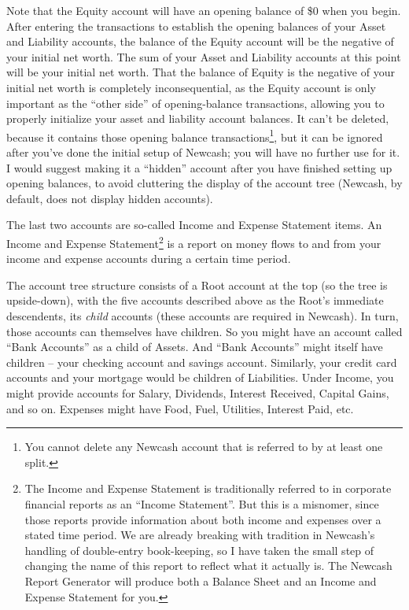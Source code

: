 \documentclass{report}
\begin{document}
Note that the Equity account will have an opening balance of \$0 when you begin.  After entering the transactions to establish the opening balances of your Asset and Liability accounts, the balance of the Equity account will be the negative of your initial net worth. The sum of your Asset and Liability accounts at this point will be your initial net worth. That the balance of Equity is the negative of your initial net worth is completely inconsequential, as the Equity account is only important as the ``other side'' of opening-balance transactions, allowing you to properly initialize your asset and liability account balances. It can't be deleted, because it contains those opening balance transactions\footnote{You cannot delete any Newcash account that is referred to by at least one split.}, but it can be ignored after you've done the initial setup of Newcash; you will have no further use for it. I would suggest making it a ``hidden'' account after you have finished setting up opening balances, to avoid cluttering the display of the account tree (Newcash, by default, does not display hidden accounts).

The last two accounts are so-called Income and Expense Statement items. An Income and Expense Statement\footnote{The Income and Expense Statement is traditionally referred to in corporate financial reports as an ``Income Statement''. But this is a misnomer, since those reports provide information about both income and expenses over a stated time period. We are already breaking with tradition in Newcash's handling of double-entry book-keeping, so I have taken the small step of changing the name of this report to reflect what it actually is. The Newcash Report Generator will produce both a Balance Sheet and an Income and Expense Statement for you.} is a report on money flows to and from your income and expense accounts during a certain time period. 

The account tree structure consists of a Root account at the top (so the tree is upside-down), with the five accounts described above as the Root's immediate descendents, its \emph{child} accounts (these accounts are required in Newcash). In turn, those accounts can themselves have children. So you might have an account called ``Bank Accounts'' as a child of Assets. And ``Bank Accounts'' might itself have children -- your checking account and savings account. Similarly, your credit card accounts and your mortgage would be children of Liabilities. Under Income, you might provide accounts for Salary, Dividends, Interest Received, Capital Gains, and so on. Expenses might have Food, Fuel, Utilities, Interest Paid, etc. 
\end{document}
